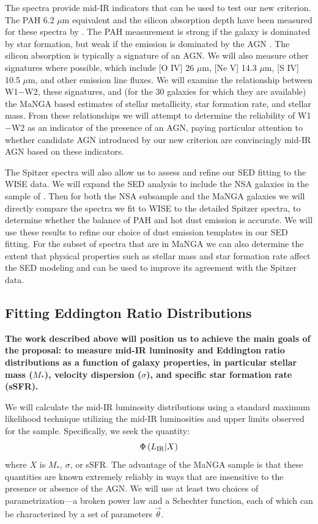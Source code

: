 \documentclass[12pt, preprint]{hacked-aastex}
\begin{document}
The spectra provide mid-IR indicators that can be used to test our new
criterion.  The PAH 6.2 $\mu$m equivalent and the silicon absorption
depth have been measured for these spectra by \cite{lambrides}.  The
PAH measurement is strong if the galaxy is dominated by star
formation, but weak if the emission is dominated by the AGN
\cite{sajina22a}.  The silicon absorption is typically a signature of
an AGN.  We will also measure other signatures where possible, which
include [O IV] 26 $\mu$m, [Ne V] 14.3 $\mu$m, [S IV] 10.5 $\mu$m, and
other emission line fluxes.  We will examine the relationship between
W1$-$W2, these signatures, and (for the 30 galaxies for which they are
available) the MaNGA based estimates of stellar metallicity, star
formation rate, and stellar mass. From these relationships we will
attempt to determine the reliability of W1$-$W2 as an indicator of the
presence of an AGN, paying particular attention to whether candidate
AGN introduced by our new criterion are convincingly mid-IR AGN based
on these indicators.

The Spitzer spectra will also allow us to assess and refine our SED
fitting to the WISE data. We will expand the SED analysis to include
the NSA galaxies in the sample of \cite{lambrides}.  Then for both the
NSA subsample and the MaNGA galaxies we will directly compare the
spectra we fit to WISE to the detailed Spitzer spectra, to determine
whether the balance of PAH and hot dust emission is accurate. We will
use these results to refine our choice of dust emission templates in
our SED fitting. For the subset of spectra that are in MaNGA we can
also determine the extent that physical properties such as stellar
mass and star formation rate affect the SED modeling and can be used
to improve its agreement with the Spitzer data.

\subsection{Fitting Eddington Ratio Distributions}
\label{sec:erd}

{\bf The work described above will position us to achieve the main
  goals of the proposal: to measure mid-IR luminosity and Eddington
  ratio distributions as a function of galaxy properties, in
  particular stellar mass ($M_\ast$), velocity dispersion ($\sigma$),
  and specific star formation rate (sSFR).}

We will calculate the mid-IR luminosity distributions using a standard
maximum likelihood technique utilizing the mid-IR luminosities and
upper limits observed for the sample. Specifically, we seek the
quantity:
\begin{equation}
\Phi\left(L_{\rm IR} | X\right)
\end{equation}
where $X$ is $M_\ast$, $\sigma$, or sSFR. The advantage of the MaNGA
sample is that these quantities are known extremely reliably in ways
that are insensitive to the presence or absence of the AGN. We will
use at least two choices of parametrization---a broken power law and a
Schechter function, each of which can be characterized by a set of
parameters $\vec{\theta}$.
\end{document}
